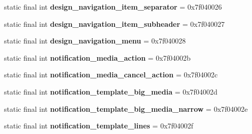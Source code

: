 \begin{DoxyCompactItemize}
\item 
\hypertarget{classandroid_1_1support_1_1design_1_1_r_1_1layout_ad96876f67d154d3fd08794c12c1efc59}{}static final int {\bfseries design\+\_\+navigation\+\_\+item\+\_\+separator} = 0x7f040026\label{classandroid_1_1support_1_1design_1_1_r_1_1layout_ad96876f67d154d3fd08794c12c1efc59}

\item 
\hypertarget{classandroid_1_1support_1_1design_1_1_r_1_1layout_a3d4b46f5c32b100f48b1cf108d0f5b68}{}static final int {\bfseries design\+\_\+navigation\+\_\+item\+\_\+subheader} = 0x7f040027\label{classandroid_1_1support_1_1design_1_1_r_1_1layout_a3d4b46f5c32b100f48b1cf108d0f5b68}

\item 
\hypertarget{classandroid_1_1support_1_1design_1_1_r_1_1layout_a68f5d00d1b2b0dbca3b4c40fcc85bd25}{}static final int {\bfseries design\+\_\+navigation\+\_\+menu} = 0x7f040028\label{classandroid_1_1support_1_1design_1_1_r_1_1layout_a68f5d00d1b2b0dbca3b4c40fcc85bd25}

\item 
\hypertarget{classandroid_1_1support_1_1design_1_1_r_1_1layout_ae4178499ed0a627b4082b09cfae99907}{}static final int {\bfseries notification\+\_\+media\+\_\+action} = 0x7f04002b\label{classandroid_1_1support_1_1design_1_1_r_1_1layout_ae4178499ed0a627b4082b09cfae99907}

\item 
\hypertarget{classandroid_1_1support_1_1design_1_1_r_1_1layout_a2afa4dd43d64918dd43e5c1b6ee43b97}{}static final int {\bfseries notification\+\_\+media\+\_\+cancel\+\_\+action} = 0x7f04002c\label{classandroid_1_1support_1_1design_1_1_r_1_1layout_a2afa4dd43d64918dd43e5c1b6ee43b97}

\item 
\hypertarget{classandroid_1_1support_1_1design_1_1_r_1_1layout_a937801124bdcdd939ce59fe3913a9762}{}static final int {\bfseries notification\+\_\+template\+\_\+big\+\_\+media} = 0x7f04002d\label{classandroid_1_1support_1_1design_1_1_r_1_1layout_a937801124bdcdd939ce59fe3913a9762}

\item 
\hypertarget{classandroid_1_1support_1_1design_1_1_r_1_1layout_a85e748195c9daddc8bb8fe726a1a5da2}{}static final int {\bfseries notification\+\_\+template\+\_\+big\+\_\+media\+\_\+narrow} = 0x7f04002e\label{classandroid_1_1support_1_1design_1_1_r_1_1layout_a85e748195c9daddc8bb8fe726a1a5da2}

\item 
\hypertarget{classandroid_1_1support_1_1design_1_1_r_1_1layout_a3b564781a7a1175a42bafaa390592c97}{}static final int {\bfseries notification\+\_\+template\+\_\+lines} = 0x7f04002f\label{classandroid_1_1support_1_1design_1_1_r_1_1layout_a3b564781a7a1175a42bafaa390592c97}


\end{DoxyCompactItemize}

